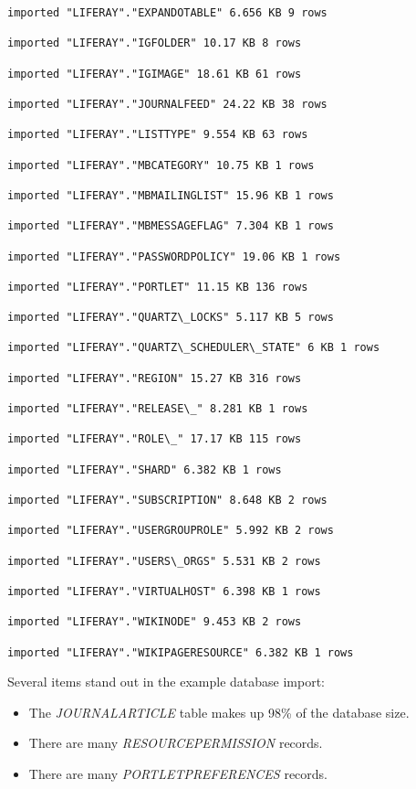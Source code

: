 \begin{verbatim}
imported "LIFERAY"."EXPANDOTABLE" 6.656 KB 9 rows
 
imported "LIFERAY"."IGFOLDER" 10.17 KB 8 rows
 
imported "LIFERAY"."IGIMAGE" 18.61 KB 61 rows
 
imported "LIFERAY"."JOURNALFEED" 24.22 KB 38 rows
 
imported "LIFERAY"."LISTTYPE" 9.554 KB 63 rows
 
imported "LIFERAY"."MBCATEGORY" 10.75 KB 1 rows
 
imported "LIFERAY"."MBMAILINGLIST" 15.96 KB 1 rows
 
imported "LIFERAY"."MBMESSAGEFLAG" 7.304 KB 1 rows
 
imported "LIFERAY"."PASSWORDPOLICY" 19.06 KB 1 rows
 
imported "LIFERAY"."PORTLET" 11.15 KB 136 rows
 
imported "LIFERAY"."QUARTZ\_LOCKS" 5.117 KB 5 rows
 
imported "LIFERAY"."QUARTZ\_SCHEDULER\_STATE" 6 KB 1 rows
 
imported "LIFERAY"."REGION" 15.27 KB 316 rows
 
imported "LIFERAY"."RELEASE\_" 8.281 KB 1 rows
 
imported "LIFERAY"."ROLE\_" 17.17 KB 115 rows
 
imported "LIFERAY"."SHARD" 6.382 KB 1 rows
 
imported "LIFERAY"."SUBSCRIPTION" 8.648 KB 2 rows
 
imported "LIFERAY"."USERGROUPROLE" 5.992 KB 2 rows
 
imported "LIFERAY"."USERS\_ORGS" 5.531 KB 2 rows
 
imported "LIFERAY"."VIRTUALHOST" 6.398 KB 1 rows
 
imported "LIFERAY"."WIKINODE" 9.453 KB 2 rows
 
imported "LIFERAY"."WIKIPAGERESOURCE" 6.382 KB 1 rows
\end{verbatim}

Several items stand out in the example database import:

\begin{itemize}
\tightlist
\item
  The \emph{JOURNALARTICLE} table makes up 98\% of the database size.
\item
  There are many \emph{RESOURCEPERMISSION} records.
\item
  There are many \emph{PORTLETPREFERENCES} records.
\end{itemize}

